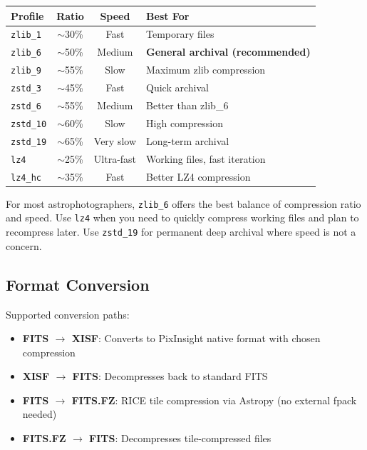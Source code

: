 \documentclass[11pt,a4paper]{article}
\begin{document}
\begin{center}
\begin{tabular}{lccl}
\toprule
\textbf{Profile} & \textbf{Ratio} & \textbf{Speed} & \textbf{Best For} \\
\midrule
\texttt{zlib\_1} & $\sim$30\% & Fast & Temporary files \\
\texttt{zlib\_6} & $\sim$50\% & Medium & \textbf{General archival (recommended)} \\
\texttt{zlib\_9} & $\sim$55\% & Slow & Maximum zlib compression \\
\texttt{zstd\_3} & $\sim$45\% & Fast & Quick archival \\
\texttt{zstd\_6} & $\sim$55\% & Medium & Better than zlib\_6 \\
\texttt{zstd\_10} & $\sim$60\% & Slow & High compression \\
\texttt{zstd\_19} & $\sim$65\% & Very slow & Long-term archival \\
\texttt{lz4} & $\sim$25\% & Ultra-fast & Working files, fast iteration \\
\texttt{lz4\_hc} & $\sim$35\% & Fast & Better LZ4 compression \\
\bottomrule
\end{tabular}
\end{center}

\begin{tipbox}
For most astrophotographers, \texttt{zlib\_6} offers the best balance of compression ratio and speed. Use \texttt{lz4} when you need to quickly compress working files and plan to recompress later. Use \texttt{zstd\_19} for permanent deep archival where speed is not a concern.
\end{tipbox}

\subsection{Format Conversion}

Supported conversion paths:
\begin{itemize}
    \item \textbf{FITS $\rightarrow$ XISF}: Converts to PixInsight native format with chosen compression
    \item \textbf{XISF $\rightarrow$ FITS}: Decompresses back to standard FITS
    \item \textbf{FITS $\rightarrow$ FITS.FZ}: RICE tile compression via Astropy (no external fpack needed)
    \item \textbf{FITS.FZ $\rightarrow$ FITS}: Decompresses tile-compressed files
\end{itemize}
\end{document}
